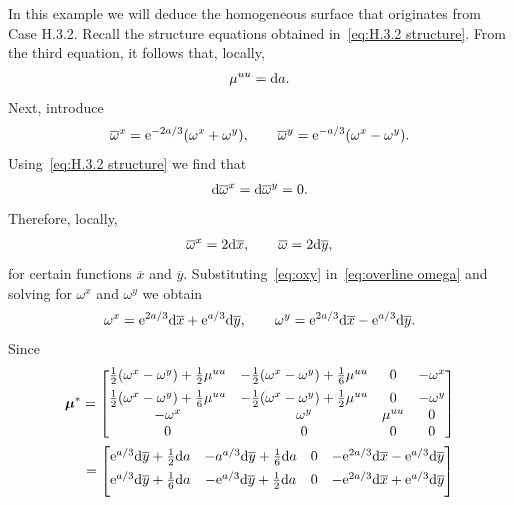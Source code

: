 \documentclass[pdftex]{sigma}%
\numberwithin{equation}{section}
\newcommand{\bmu}{\boldsymbol{\mu}}
\newcommand{\ox}{\overline{x}}
\newcommand{\oy}{\overline{y}}
\begin{document}
\begin{Example}
In this example we will deduce the homogeneous surface that originates from Case H.3.2. Recall the structure equations obtained in~\eqref{eq:H.3.2 structure}. From the third equation, it follows that, locally,
\begin{gather*}
\mu^{uu} ={\rm d}a.
\end{gather*}
Next, introduce
%
\begin{gather}\label{eq:overline omega}
\overline{\omega}^x = {\rm e}^{-2a/3}(\omega^x+\omega^y),\qquad
\overline{\omega}^y = {\rm e}^{-a/3}(\omega^x-\omega^y).
\end{gather}
%
Using~\eqref{eq:H.3.2 structure} we find that
%
\begin{gather*}
{\rm d}\overline{\omega}^x = {\rm d}\overline{\omega}^y = 0.
\end{gather*}
%
Therefore, locally,
%
\begin{gather}\label{eq:oxy}
\overline{\omega}^x = 2 {\rm d}\ox,\qquad
\overline{\omega}=2 {\rm d}\oy,
\end{gather}
for certain functions $\ox$ and $\oy$. Substituting~\eqref{eq:oxy} in~\eqref{eq:overline omega} and solving for $\omega^x$ and $\omega^y$ we obtain
\begin{gather*}
\omega^x = {\rm e}^{2a/3}{\rm d}\ox + {\rm e}^{a/3}{\rm d}\oy,\qquad
\omega^y = {\rm e}^{2a/3}{\rm d}\ox - {\rm e}^{a/3}{\rm d}\oy.
\end{gather*}
Since
%
\begin{gather}
\bmu^*=
\begin{bmatrix}
\frac{1}{2}(\omega^x-\omega^y)+\frac{1}{2}\mu^{uu} & -\frac{1}{2}(\omega^x-\omega^y)+\frac{1}{6}\mu^{uu} & 0 & -\omega^x \\[1ex]
%
\frac{1}{2}(\omega^x-\omega^y) +\frac{1}{6}\mu^{uu} & -\frac{1}{2}(\omega^x-\omega^y)+\frac{1}{2}\mu^{uu} & 0 & -\omega^y \\
%
-\omega^x & \omega^y &\mu^{uu} & 0 \\
%
0 & 0 & 0 & 0
\end{bmatrix} \nonumber
\\ \hphantom{\bmu^*}
=\begin{bmatrix}
{\rm e}^{a/3}{\rm d}\oy + \frac{1}{2}{\rm d}a & -a^{a/3}{\rm d}\oy + \frac{1}{6}{\rm d}a & 0 & -{\rm e}^{2a/3}{\rm d}\ox - {\rm e}^{a/3}{\rm d}\oy \\[1ex]
%
{\rm e}^{a/3}{\rm d}\oy + \frac{1}{6}{\rm d}a & -{\rm e}^{a/3}{\rm d}\oy + \frac{1}{2}{\rm d}a & 0 & -{\rm e}^{2a/3}{\rm d}\ox + {\rm e}^{a/3}{\rm d}\oy \\[1ex]

\end{bmatrix}
\end{gather}
\end{Example}
\end{document}
